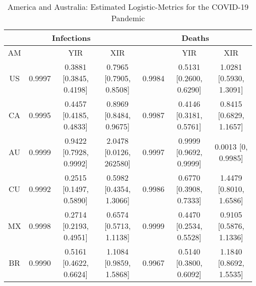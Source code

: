 \documentclass[journal]{IEEEtran}
\theoremstyle{plain}
\theoremstyle{definition}
\theoremstyle{remark}
\begin{document}
\begin{table*}[t]
	\caption{America and Australia: Estimated Logistic-Metrics for the COVID-19 Pandemic}
	\centering
	\def\arraystretch{1.5}\begin{tabular}{|c|c|c|c|c|c|c|}
	\hline
	\multicolumn{4}{|c||}{Infections}&
	\multicolumn{3}{c|}{Deaths}\\
	\hline\hline
	AM &  & YIR & XIR &  & YIR & XIR \\
	\hline\hline
	US&  0.9997		
	&  0.3881 [0.3845, 0.4198]&  0.7965 [0.7905, 0.8508]& 0.9984& 0.5131	[0.2600, 0.6290] & 1.0281	[0.5930, 1.3091] \\
	\hline
	CA&  0.9995		
	&  0.4457 [0.4185, 0.4833]&  0.8969 [0.8484, 0.9675]&  0.9987&  0.4146	[0.3181, 0.5761]& 0.8415 [0.6829, 1.1657]\\
	\hline
	AU&  0.9999	
	& 0.9422 [0.7928, 0.9992]&  2.0478 [0.0126, 262580]&  0.9997		
	& 0.9999 [0.9692, 0.9999]& 0.0013 [0, 0.9985]\\
	\hline
	CU&  0.9992	
	&  0.2515 [0.1497, 0.5890]&  0.5982 [0.4354, 1.3066]&  0.9986 &  0.6770 [0.3908, 0.7333]& 1.4479	[0.8010, 1.6586]  \\
	\hline
	MX&  0.9998	
	&  0.2714 [0.2193, 0.4951]&  0.6574 [0.5713, 1.1138]& 0.9999&  0.4470	[0.2534, 0.5528]& 0.9105 [0.5876, 1.1336] \\
	\hline
	BR& 0.9990		
	 &  0.5161 [0.4622, 0.6624]&  1.1084 [0.9859, 1.5868]& 0.9967		
	  & 0.5140 [0.3800, 0.6092] & 1.1840 [0.8692, 1.5535] \\
	\hline
\end{tabular}
\label{table_amau}
\end{table*}
\end{document}
